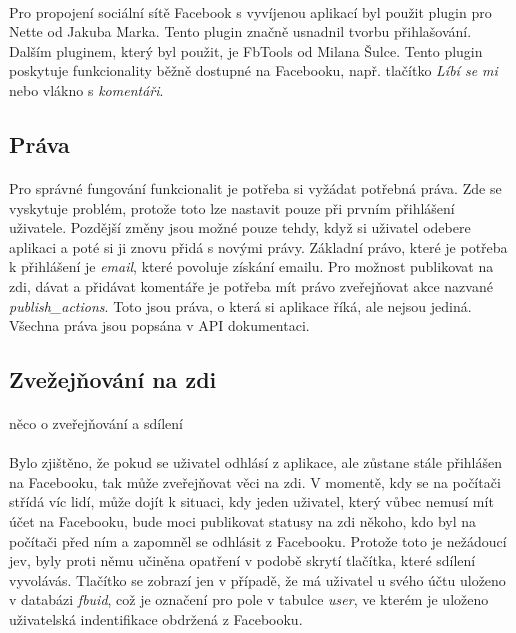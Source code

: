 \documentclass[11pt,a4paper,titlepage,oneside]{book}
\begin{document}
				\paragraph{} Pro propojení sociální sítě Facebook s vyvíjenou aplikací byl použit plugin pro Nette\cite{nette20login} od Jakuba Marka. Tento plugin značně usnadnil tvorbu přihlašování. Dalším pluginem, který byl použit, je FbTools\cite{FbTools} od Milana Šulce. Tento plugin poskytuje funkcionality běžně dostupné na Facebooku, např. tlačítko \textit{Líbí se mi} nebo vlákno s \textit{komentáři}.
			\subsection{Práva}
				\paragraph{} Pro správné fungování funkcionalit je potřeba si vyžádat potřebná  práva. Zde se vyskytuje problém, protože toto lze nastavit pouze při prvním přihlášení uživatele. Pozdější změny jsou možné pouze tehdy, když si uživatel odebere aplikaci a poté si ji znovu přidá s novými právy. Základní právo, které je potřeba k přihlášení je \textit{email}, které povoluje získání emailu. Pro možnost publikovat na zdi, dávat  a přidávat komentáře je potřeba mít právo zveřejňovat akce nazvané \textit{publish\_actions}. Toto jsou práva, o která si aplikace říká, ale nejsou jediná. Všechna práva jsou popsána v API dokumentaci\cite{FbApiPrava}.
			\subsection{Zvežejňování na zdi}
				\paragraph{} {\Huge něco o zveřejňování a sdílení}
				\paragraph{} Bylo zjištěno, že pokud se uživatel odhlásí z aplikace, ale zůstane stále přihlášen na Facebooku, tak může zveřejňovat věci na zdi. V momentě, kdy se na počítači střídá víc lidí, může dojít k situaci, kdy jeden uživatel, který vůbec nemusí mít účet na Facebooku, bude moci publikovat statusy na zdi někoho, kdo byl na počítači před ním a zapomněl se odhlásit z Facebooku. Protože toto je nežádoucí jev, byly proti němu učiněna opatření v podobě skrytí tlačítka, které sdílení vyvolávás. Tlačítko se zobrazí jen v případě, že má uživatel u svého účtu uloženo v databázi \textit{fbuid}, což je označení pro pole v tabulce \textit{user}, ve kterém je uloženo uživatelská indentifikace obdržená z Facebooku.
		
\end{document}
